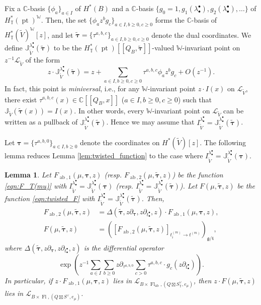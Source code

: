 \documentclass[a4paper,12pt]{amsart}
\numberwithin{equation}{section}
\newtheorem{lemma}[theorem]{Lemma}
\theoremstyle{definition}
\newcommand{\C}{\mathbb{C}}
\newcommand{\J}{\mathbb{J}}
\newcommand{\T}{\mathbb{T}}
\newcommand{\W}{\mathbb{W}}
\newcommand{\btau}{{\bm{\tau}}}
\newcommand{\cL}{\mathcal{L}}
\newcommand{\gt}{{\mathfrak{g}/\mathfrak{t}}}
\newcommand{\pt}{\operatorname{pt}}
\newcommand{\FlG}{\operatorname{Fl}}
\newcommand{\FlT}{\operatorname{Fl}_{\operatorname{ab}}}
\begin{document}
Fix a $\C$-basis $\{\phi_a\}_{a\in I}$ of $H^*(B)$ and a $\C$-basis $\{g_0=1,g_1(\lambda_\bullet^\bullet),g_2(\lambda_\bullet^\bullet),\dots\}$ of $H^*_\T(\pt)^\W$.
Then, the set $\{\phi_az^bg_c\}_{a\in I, b\geq0, c\geq0}$ forms the $\C$-basis of $H^*_\T(\widetilde{V})^\W[z]$, and let $\widetilde{\btau}=\{\tau^{a,b,c}\}_{a\in I,b\geq0,c\geq0}$ denote the dual coordinates.
We define $\J_{\widetilde{V}}^{\lambda_\bullet^\bullet}(\widetilde{\btau})$ to be the $H^*_\T(\pt)[\![Q_B,\widetilde{\btau}]\!]$-valued $\W$-invariant point on $z^{-1}\cL_{\widetilde{V}}$ of the form
\[
z\cdot \J_{\widetilde{V}}^{\lambda_\bullet^\bullet}(\widetilde{\btau}) = z + \sum_{a\in I,b\geq0,c\geq0} \tau^{a,b,c}\phi_az^bg_c + O(z^{-1}).
\]
In fact, this point is \emph{miniversal}, i.e., for any $\W$-invariant point $z\cdot I(x)$ on $\cL_{\widetilde{V}}$, there exist $\tau^{a,b,c}(x)\in\C[\![Q_B,x]\!]$ ($a\in I,b\geq0,c\geq0$) such that $\J_{\widetilde{V}}(\widetilde{\btau}(x))=I(x)$. 
In other words, every $\W$-invariant point on $\cL_{\widetilde{V}}$ can be written as a pullback of $\J_{\widetilde{V}}^{\lambda_\bullet^\bullet}(\widetilde{\btau})$.
Hence we may assume that $I_{\widetilde{V}}^{\lambda_\bullet^\bullet}=\J_{\widetilde{V}}^{\lambda_\bullet^\bullet}(\widetilde{\btau})$.

Let $\btau=\{\tau^{a,b,0}\}_{a\in I,b\geq0}$ denote the coordinates on $H^*(\widetilde{V})[z]$.
The following lemma reduces Lemma \ref{lem:twisted_function} to the case where $I_{\widetilde{V}}^{\lambda_\bullet^\bullet}=\J_{\widetilde{V}}^{\lambda_\bullet^\bullet}(\btau)$.

\begin{lemma}\label{lemma_reduction2}
    Let $F_{\operatorname{ab},1}(\mu,\btau,z)$ (resp. $F_{\operatorname{ab},2}(\mu,\widetilde{\btau},z)$) be the function \eqref{eqn:F_T(mu)} with $I_{\widetilde{V}}^{\lambda_\bullet^\bullet}=\J_{\widetilde{V}}^{\lambda_\bullet^\bullet}(\btau)$ (resp. $I_{\widetilde{V}}^{\lambda_\bullet^\bullet}=\J_{\widetilde{V}}^{\lambda_\bullet^\bullet}(\widetilde{\btau})$).
    Let $F(\mu,\widetilde{\btau},z)$ be the function \eqref{eqn:twisted_F} with $I_{\widetilde{V}}^{\lambda_\bullet^\bullet}=\J_{\widetilde{V}}^{\lambda_\bullet^\bullet}(\widetilde{\btau})$.
    Then,
    \begin{align}
        F_{\operatorname{ab},2}(\mu,\widetilde{\btau},z) &= \Delta(\widetilde{\btau},z\partial_\btau,z\partial_{t_\bullet^\bullet},z) \cdot F_{\operatorname{ab},1}(\mu,\btau,z), \label{eqn:first_claim}\\
        F(\mu,\widetilde{\btau},z) &= \left( \left[ F_{\operatorname{ab},2}(\mu,\widetilde{\btau},z) \right]_{t^{(m)}_i\to t^{(m)}} \right)_\gt,\label{eqn:second_claim}
    \end{align}
    where $\Delta(\widetilde{\btau},z\partial_\btau,z\partial_{t_\bullet^\bullet},z)$ is the differential operator
    \[
    \exp\left( z^{-1} \sum_{a\in I} \sum_{b\geq0} z\partial_{\tau^{a,b,0}} \sum_{c>0} \tau^{a,b,c} \cdot g_c(z\partial_{t_\bullet^\bullet}) \right).
    \]
    In particular, if $z\cdot F_{\operatorname{ab},1}(\mu,\btau,z)$ lies in $\cL_{B\times\FlT,(Q\boxtimes S^\vee_\T,e_\mu)}$, then $z\cdot F(\mu,\widetilde{\btau},z)$ lies in $\cL_{B\times\FlG,(Q\boxtimes S^\vee,e_\mu)}$.
\end{lemma}
\end{document}
